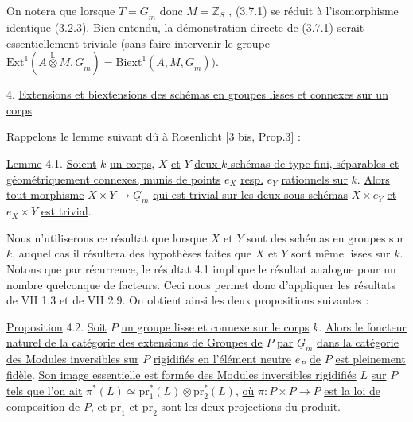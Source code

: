 On notera que lorsque $T = \underline{G}_m$ donc $\underline{M} = \mathbb{Z}_S$ , (3.7.1) se réduit à l'isomorphisme identique (3.2.3). Bien entendu, la démonstration directe de (3.7.1) serait essentiellement triviale (sans faire intervenir le groupe $\mathrm{Ext}^1(A \stackrel{\mathbb{L}}{\otimes} \underline{M},\underline{G}_m) =\mathrm{Biext}^1(A,\underline{M},\underline{G}_m))$.




4. \underline{Extensions et biextensions des schémas en groupes lisses et connexes sur un corps}

Rappelons le lemme suivant dû à Rosenlicht [3 bis, Prop.3] :

\underline{Lemme} 4.1. \underline{Soient} $k$ \underline{un corps}, $X$ \underline{et} $Y$ \underline{deux $k$-schémas de type fini, séparables et géométriquement connexes, munis de points} $e_X$ \underline{resp.} $e_Y$ \underline{rationnels sur} $k$. \underline{Alors tout morphisme} $X \times Y \longrightarrow \underline{G}_m$ \underline{qui est trivial sur les deux sous-schémas} $X \times e_Y$ \underline{et} $e_X \times Y$ \underline{est trivial}.

Nous n'utiliserons ce résultat que lorsque $X$ et $Y$ sont des schémas en groupes sur $k$, auquel cas il résultera des hypothèses faites que $X$ et $Y$ sont même lisses sur $k$. Notons que par récurrence, le résultat 4.1 implique le résultat analogue pour un nombre quelconque de facteurs. Ceci nous permet donc d'appliquer les résultats de VII 1.3 et de VII 2.9. On obtient ainsi les deux propositions suivantes :

\underline{Proposition} 4.2. \underline{Soit} $P$ \underline{un groupe lisse et connexe sur le corps} $k$. \underline{Alors le foncteur naturel de la catégorie des extensions de Groupes de} $P$ \underline{par} $\underline{G}_m$ \underline{dans la catégorie des Modules inversibles sur} $P$ \underline{rigidifiés en l'élément neutre} $e_P$ \underline{de} $P$ \underline{est pleinement fidèle}. \underline{Son image essentielle est formée des Modules inversibles rigidifiés} $\underline{L}$ \underline{sur} $P$ \underline{tels que l'on ait} $\pi^*(L) \simeq \mathrm{pr}_1^*(L)\otimes\mathrm{pr}_2^*(L)$, \underline{où} $\pi : P \times P \longrightarrow P$ \underline{est la loi de composition de} $P$, \underline{et} $\mathrm{pr}_1$ \underline{et} $\mathrm{pr}_2$ \underline{sont les deux projections du produit}.

